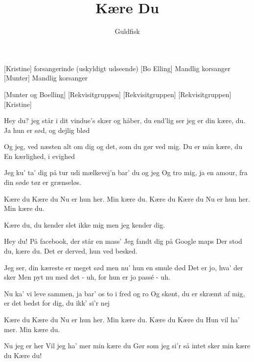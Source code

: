 \documentclass[a4paper,11pt]{article}
\title{Kære Du}
\author{Guldfisk}
\begin{document}
\maketitle

\begin{roles}  
[Kristine] forsangerinde (uskyldigt udseende)
[Bo Elling] Mandlig korsanger
[Munter] Mandlig korsanger
\end{roles}

\begin{props}
[Munter og Boelling]
[Rekvisitgruppen]
[Rekvisitgruppen]
[Rekvisitgruppen]
[Kristine]
\end{props}

\begin{song}

   Hey du?
jeg står i dit vindue's skær
og håber, du end'lig ser
jeg er din kære, du.
 Ja hun er sød, og dejlig blød

   Og jeg,
ved næsten alt om dig
og det, som du gør ved mig.
Du er min kære, du
 En kærlighed, i evighed

   Jeg ku' ta' dig på tur
udi mælkevej'n
bar' du og jeg
Og tro mig, ja en amour,
fra din søde tøz
er grænseløs.

   Kære du
Kære du
 Nu er hun her.
   Min kære du.
Kære du
Kære du
 Nu er hun her.
   Min kære du.

   Kære du, du kender slet ikke mig
men jeg kender dig.

   Hey du!
På facebook, der står en mass'
Jeg fandt dig på Google maps
Der stod du, kære du.
 Det er derved, hun ved besked.

   Jeg ser,
din kæreste er meget sød
men nu' hun en smule død
Det er jo, hva' der sker
 Men pyt nu med det - uh, for hun er jo passé - uh.

   Nu ka' vi leve sammen, ja bar' os to
i fred og ro
Og skønt, du er skræmt af mig,
er det bedst for dig,
du ikk' si'r nej

   Kære du
Kære du
 Nu er hun her.
   Min kære du.
Kære du
Kære du
 Hun vil ha' mer.
   Min kære du.

   Nu jeg er her
Vil jeg ha' mer
min kære du
Gør som jeg si'r
så intet sker
min kære du
Kære du!

\end{song}
\end{document}
